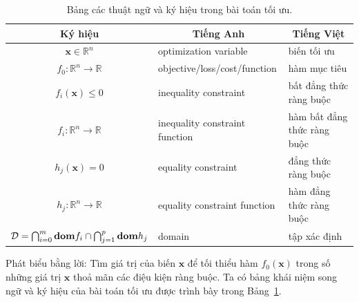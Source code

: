 \begin{table}[t]
\centering
\caption{Bảng các thuật ngữ và ký hiệu trong bài toán tối ưu.}
\label{tab:17_terms}
\setlength{\tabcolsep}{0.5em}
{\small {}
\begin{tabular}{|c|l|l|}
\hline
\multicolumn{1}{|c|}{\textbf{Ký hiệu}} & \multicolumn{1}{c|}{\textbf{Tiếng Anh}}
& \multicolumn{1}{c|}{\textbf{Tiếng Việt}} \\ \hline \hline
$\mathbf{x} \in \mathbb{R}^n$   & optimization variable                   & biến tối ưu                              \\ \hline
$f_0: \mathbb{R}^n \rightarrow \mathbb{R}$  & objective/loss/cost/function            & hàm mục tiêu                             \\ \hline
$f_i(\mathbf{x}) \leq 0 $  & inequality constraint                   & bất đẳng thức ràng buộc                  \\ \hline
$f_i: \mathbb{R}^n \rightarrow \mathbb{R}$  & inequality constraint function          & hàm bất đẳng thức ràng buộc              \\ \hline
$h_j(\mathbf{x}) = 0 $   & equality constraint                     & đẳng thức ràng buộc                      \\ \hline
$h_j: \mathbb{R}^n \rightarrow \mathbb{R}$   & equality constraint function            & hàm đẳng thức ràng buộc                  \\ \hline
$\mathcal{D} = \bigcap_{i=0}^m \text{\bf dom}f_i \cap \bigcap_{j=1}^p \text{\bf dom}h_j $  & domain                                  & tập xác định                             \\ \hline
\end{tabular}}
\end{table}

Phát biểu bằng lời: Tìm giá trị của biến $\mathbf{x}$ để tối thiểu hàm
$f_0(\mathbf{x})$ trong số những giá trị $\mathbf{x}$ thoả mãn các điệu kiện
ràng buộc. Ta có bảng khái niệm song ngữ và ký hiệu của bài toán tối ưu được trình bày  trong Bảng~\ref{tab:17_terms}.

